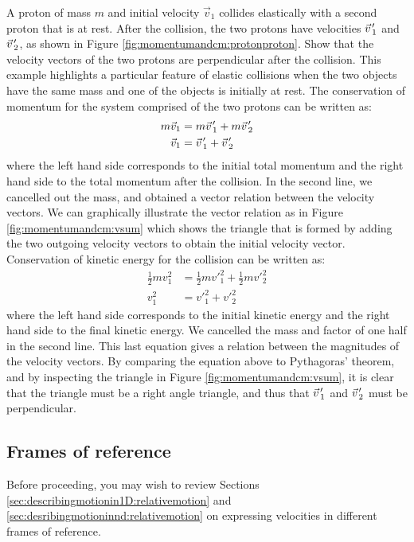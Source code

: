 \begin{example}{
 A proton of mass $m$ and initial velocity $\vec v_1$ collides elastically with a second proton that is at rest. After the collision, the two protons have velocities $\pvec v'_1$ and $\pvec v'_2$, as shown in Figure \ref{fig:momentumandcm:protonproton}. Show that the velocity vectors of the two protons are perpendicular after the collision.}
This example highlights a particular feature of elastic collisions when the two objects have the same mass and one of the objects is initially at rest. The conservation of momentum for the system comprised of the two protons can be written as:
\begin{align*}
m\vec v_1 &= m\pvec v'_1 + m\pvec v'_2\\
\vec v_1 &= \pvec v'_1 + \pvec v'_2
\end{align*}
where the left hand side corresponds to the initial total momentum and the right hand side to the total momentum after the collision. In the second line, we cancelled out the mass, and obtained a vector relation between the velocity vectors. We can graphically illustrate the vector relation as in Figure \ref{fig:momentumandcm:vsum} which shows the triangle that is formed by adding the two outgoing velocity vectors to obtain the initial velocity vector.
Conservation of kinetic energy for the collision can be written as:
\begin{align*}
\frac{1}{2}mv_1^2 &= \frac{1}{2}mv'^2_1+\frac{1}{2}mv'^2_2\\
v_1^2 &= v'^2_1+ v'^2_2
\end{align*}
where the left hand side corresponds to the initial kinetic energy and the right hand side to the final kinetic energy. We cancelled the mass and factor of one half in the second line. This last equation gives a relation between the magnitudes of the velocity vectors. By comparing the equation above to Pythagoras' theorem, and by inspecting the triangle in Figure \ref{fig:momentumandcm:vsum}, it is clear that the triangle must be a right angle triangle, and thus that $\pvec v'_1$ and $\pvec v'_2$ must be perpendicular.
\end{example}

\subsection{Frames of reference}
\begin{review}
Before proceeding, you may wish to review Sections \ref{sec:describingmotionin1D:relativemotion} and  \ref{sec:desribingmotioninnd:relativemotion} on expressing velocities in different frames of reference.
\end{review}

